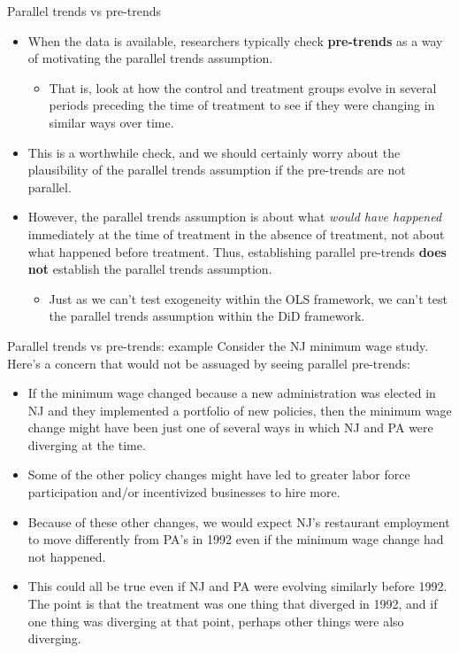 \documentclass[aspectratio=169,11pt]{beamer}
\begin{document}
\begin{frame}{Parallel trends vs pre-trends}
\begin{itemize}
  \item When the data is available, researchers typically check {\bf pre-trends}
  as a way of motivating the parallel trends assumption.
  \begin{itemize}
    \item That is, look at how the control and treatment groups evolve in several
    periods preceding the time of treatment to see if they were changing in similar
    ways over time.
  \end{itemize}
  
  \smallskip
  \item This is a worthwhile check, and we should certainly worry about the plausibility
  of the parallel trends assumption if the pre-trends are not parallel.
  
  \smallskip
  \item However, the parallel trends assumption is about what \emph{would have happened}
  immediately at the time of treatment in the absence of treatment, not about what
  happened before treatment. Thus, establishing parallel pre-trends {\bf does not} establish
  the parallel trends assumption.
  \begin{itemize}
  \item  Just as we can't test exogeneity within the OLS framework, we can't test
  the parallel trends assumption within the DiD framework. 
  \end{itemize}
\end{itemize}
\end{frame}

\begin{frame}{Parallel trends vs pre-trends: example}
Consider the NJ minimum wage study. Here's a concern that would not be assuaged by seeing parallel pre-trends:
\begin{itemize}
  \item  If the minimum wage changed 
  because a new administration was elected in NJ and they implemented a portfolio
  of new policies, then the minimum wage change might have been just one of several
  ways in which NJ and PA were diverging at the time.  
  
  \smallskip
  \item Some of the other policy changes might have led to greater labor force participation and/or
  incentivized businesses to hire more.
  
  \smallskip 
  \item Because of these other changes, we would expect NJ's restaurant employment to move
  differently from PA's in 1992 even if the minimum wage change had not happened.

  \smallskip
  \item This could all be true even if NJ and PA were evolving similarly before 1992. The point is that
    the treatment was one thing that diverged in 1992, and if one thing was diverging at that point,
    perhaps other things were also diverging. 
\end{itemize}
\end{frame}
\end{document}
